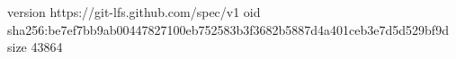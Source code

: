 version https://git-lfs.github.com/spec/v1
oid sha256:be7ef7bb9ab00447827100eb752583b3f3682b5887d4a401ceb3e7d5d529bf9d
size 43864
